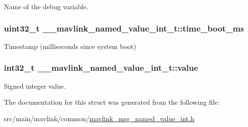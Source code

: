 Name of the debug variable. 

\hypertarget{struct____mavlink__named__value__int__t_ab9e1d97f4b6a53bac6086743223c4249}{
\subsubsection[{time\+\_\+boot\+\_\+ms}]{\setlength{\rightskip}{0pt plus 5cm}uint32\+\_\+t \+\_\+\+\_\+mavlink\+\_\+named\+\_\+value\+\_\+int\+\_\+t\+::time\+\_\+boot\+\_\+ms}}\label{struct____mavlink__named__value__int__t_ab9e1d97f4b6a53bac6086743223c4249}


Timestamp (milliseconds since system boot) 

\hypertarget{struct____mavlink__named__value__int__t_ab6bdae0f70ba0c8bece0d206c0075fef}{
\subsubsection[{value}]{\setlength{\rightskip}{0pt plus 5cm}int32\+\_\+t \+\_\+\+\_\+mavlink\+\_\+named\+\_\+value\+\_\+int\+\_\+t\+::value}}\label{struct____mavlink__named__value__int__t_ab6bdae0f70ba0c8bece0d206c0075fef}


Signed integer value. 



The documentation for this struct was generated from the following file\+:\begin{DoxyCompactItemize}
\item 
src/main/mavlink/common/\hyperlink{mavlink__msg__named__value__int_8h}{mavlink\+\_\+msg\+\_\+named\+\_\+value\+\_\+int.\+h}\end{DoxyCompactItemize}
